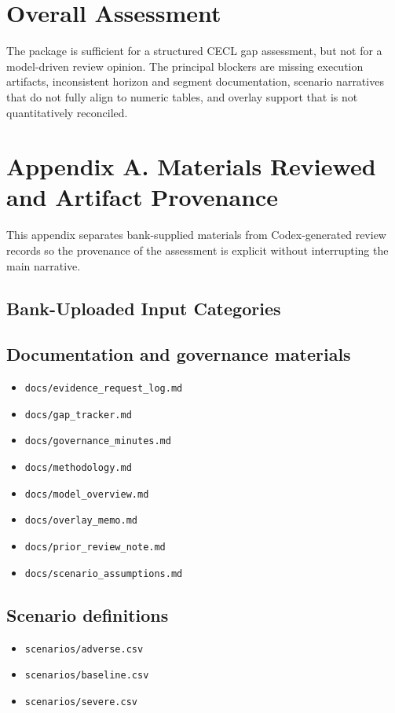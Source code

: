 \documentclass[11pt]{article}
\begin{document}
\section*{Overall Assessment}
The package is sufficient for a structured CECL gap assessment, but not for a model-driven review opinion. The principal blockers are missing execution artifacts, inconsistent horizon and segment documentation, scenario narratives that do not fully align to numeric tables, and overlay support that is not quantitatively reconciled.
\section*{Appendix A. Materials Reviewed and Artifact Provenance}
This appendix separates bank-supplied materials from Codex-generated review records so the provenance of the assessment is explicit without interrupting the main narrative.
\subsection*{Bank-Uploaded Input Categories}
\subsection*{Documentation and governance materials}
\begin{itemize}
\item \texttt{docs/evidence\_request\_log.md}
\item \texttt{docs/gap\_tracker.md}
\item \texttt{docs/governance\_minutes.md}
\item \texttt{docs/methodology.md}
\item \texttt{docs/model\_overview.md}
\item \texttt{docs/overlay\_memo.md}
\item \texttt{docs/prior\_review\_note.md}
\item \texttt{docs/scenario\_assumptions.md}
\end{itemize}
\subsection*{Scenario definitions}
\begin{itemize}
\item \texttt{scenarios/adverse.csv}
\item \texttt{scenarios/baseline.csv}
\item \texttt{scenarios/severe.csv}
\end{itemize}
\end{document}
